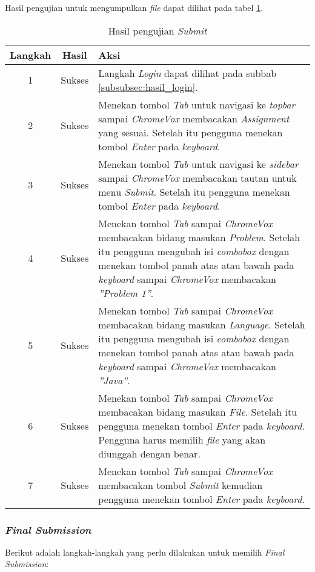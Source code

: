 Hasil pengujian untuk mengumpulkan \textit{file} dapat dilihat pada tabel \ref{tab:hasil_submit}.

\begin{table}[H]
	\centering
	\caption{Hasil pengujian \textit{Submit}}
	\label{tab:hasil_submit}
	\begin{tabular}{|c|c|p{12cm}|}
		\toprule
		Langkah & Hasil & Aksi\\
		\midrule
		1 & Sukses & Langkah \textit{Login} dapat dilihat pada subbab \ref{subsubsec:hasil_login}.\\
		2 & Sukses & Menekan tombol \textit{Tab} untuk navigasi ke \textit{topbar} sampai \textit{ChromeVox} membacakan \textit{Assignment} yang sesuai. Setelah itu pengguna menekan tombol \textit{Enter} pada \textit{keyboard}.\\
		3 & Sukses & Menekan tombol \textit{Tab} untuk navigasi ke \textit{sidebar} sampai \textit{ChromeVox} membacakan tautan untuk menu \textit{Submit}. Setelah itu pengguna menekan tombol \textit{Enter} pada \textit{keyboard}.\\
		4 & Sukses & Menekan tombol \textit{Tab} sampai \textit{ChromeVox} membacakan bidang masukan \textit{Problem}. Setelah itu pengguna mengubah isi \textit{combobox} dengan menekan tombol panah atas atau bawah pada \textit{keyboard} sampai \textit{ChromeVox} membacakan \textit{''Problem 1''}.\\
		5 & Sukses & Menekan tombol \textit{Tab} sampai \textit{ChromeVox} membacakan bidang masukan \textit{Language}. Setelah itu pengguna mengubah isi \textit{combobox} dengan menekan tombol panah atas atau bawah pada \textit{keyboard} sampai \textit{ChromeVox} membacakan \textit{''Java''}.\\
		6 & Sukses & Menekan tombol \textit{Tab} sampai \textit{ChromeVox} membacakan bidang masukan \textit{File}. Setelah itu pengguna menekan tombol \textit{Enter} pada \textit{keyboard}. Pengguna harus memilih \textit{file} yang akan diunggah dengan benar.\\
		7 & Sukses & Menekan tombol \textit{Tab} sampai \textit{ChromeVox} membacakan tombol \textit{Submit} kemudian pengguna menekan tombol \textit{Enter} pada \textit{keyboard}.\\
		\bottomrule
	\end{tabular}
\end{table}

\subsubsection{\textit{Final Submission}}
\label{subsubsec:skenario_final_submission}
Berikut adalah langkah-langkah yang perlu dilakukan untuk memilih \textit{Final Submission}:


